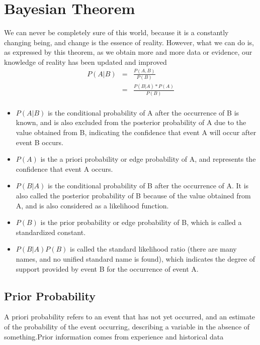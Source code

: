 \section{Bayesian Theorem}\label{Banach Spaces}
We can never be completely sure of this world, because it is a constantly changing being, and change is the essence of reality. However, what we can do is, as expressed by this theorem, as we obtain more and more data or evidence, our knowledge of reality has been updated and improved
\begin{eqnarray*}
P(A|B) &=& \frac{P(A,B)}{P(B)} \\
& = &\frac{P(B|A)*P(A)}{P(B)} \\
\end{eqnarray*}
\begin{itemize}
  \item $P(A | B)$ is the conditional probability of A after the occurrence of B is known, and is also excluded from the posterior probability of A due to the value obtained from B, indicating the confidence that event A will occur after event B occurs.

  \item $P(A)$ is the a priori probability or edge probability of A, and represents the confidence that event A occurs.

  \item $P(B|A)$ is the conditional probability of B after the occurrence of A. It is also called the posterior probability of B because of the value obtained from A, and is also considered as a likelihood function.

  \item $P(B)$ is the prior probability or edge probability of B, which is called a standardized constant.

  \item $P(B | A) P(B)$ is called the standard likelihood ratio (there are many names, and no unified standard name is found), which indicates the degree of support provided by event B for the occurrence of event A.
\end{itemize}
\subsection{Prior Probability}

A priori probability refers to an event that has not yet occurred, and an estimate of the probability of the event occurring, describing a variable in the absence of something.Prior information comes from experience and historical data


